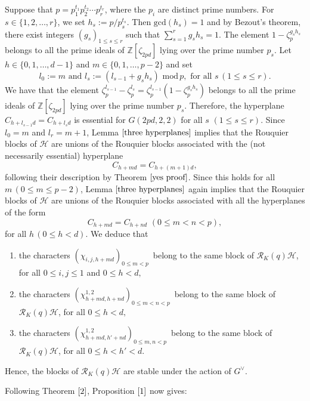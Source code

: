 \documentclass[10pt,a4paper,titlepage]{article}
\begin{document}
\begin{apod}
{Suppose that $p=p_1^{t_1}p_2^{t_2}\cdots p_r^{t_r}$, where the $p_i$ are distinct prime numbers. For $s \in \{1,2,\ldots,r\}$, we set
$h_s:= p/p_s^{t_s}.$ Then $\mathrm{gcd}(h_s)=1$ and by Bezout's theorem, there exist integers $(g_s)_{1 \leq s \leq r}$ such that $\sum_{s=1}^rg_sh_s=1$.
The element $1-\zeta_{p}^{g_sh_s}$ belongs to all the prime ideals of $\mathbb{Z}[\zeta_{2pd}]$ lying over the prime number $p_s$.  Let $h \in \{0,1,\ldots,d-1\}$ and $m \in \{0,1,\ldots,p-2\}$ and set
 $$l_0:=m \textrm{ and } l_s:=(l_{s-1}+g_sh_s) \,\,\mathrm{ mod }\,p, \textrm{ for all } s\,(1 \leq s \leq r).$$
We have that the element $\zeta_{p}^{l_{s-1}}-\zeta_{p}^{l_{s}}=\zeta_{p}^{l_{s-1}}(1-\zeta_{p}^{g_{s}h_s})$ belongs to all the prime ideals of $\mathbb{Z}[\zeta_{2pd}]$ lying over the prime number $p_s$.
Therefore, the hyperplane $C_{h+l_{s-1}d}=C_{h+l_sd}$ is essential for $G(2pd,2,2)$ for all $s$ $(1 \leq s \leq r)$.
Since $l_0=m$ and $l_r=m+1$, Lemma $\ref{three hyperplanes}$ implies that the Rouquier blocks of $\mathcal{H}$ are unions of the Rouquier blocks associated with the (not necessarily essential) hyperplane
$$C_{h+md}=C_{h+(m+1)d},$$
following their description by Theorem $\ref{yes proof}$. Since this holds for all
$m\,(0 \leq m \leq p-2)$, Lemma $\ref{three hyperplanes}$ again implies that 
the Rouquier blocks of $\mathcal{H}$ are unions of the Rouquier blocks associated with  all the hyperplanes of the form 
$$C_{h+md}=C_{h+nd} \,\,(0 \leq m < n < p),$$
for all $h\,(0 \leq h < d)$. We deduce that
\begin{enumerate}[(1)]
\item the characters $(\chi_{i,j,h+md})_{ 0 \leq m < p}\,$ belong to the same block of  $\mathcal{R}_K(q)\mathcal{H}$, for all $0\leq i,j\leq 1$ and $0\leq h <d,$
\item the characters $(\chi_{h+md,h+nd}^{1,2})_{ 0 \leq m<n< p}\,$ belong to the same block of  $\mathcal{R}_K(q)\mathcal{H}$, for all  $0\leq h <d,$
\item the characters $(\chi_{h+md,h'+nd}^{1,2})_{ 0 \leq m,n< p}\,$ belong to the same block of  $\mathcal{R}_K(q)\mathcal{H}$, for all  $0\leq h<h' <d$.
\end{enumerate}
Hence, the blocks of $\mathcal{R}_K(q)\mathcal{H}$ are stable under the action of $G^\vee$.
} 
\end{apod}

Following Theorem $\ref{2}$, Proposition $\ref{1}$ now gives:
\end{document}
